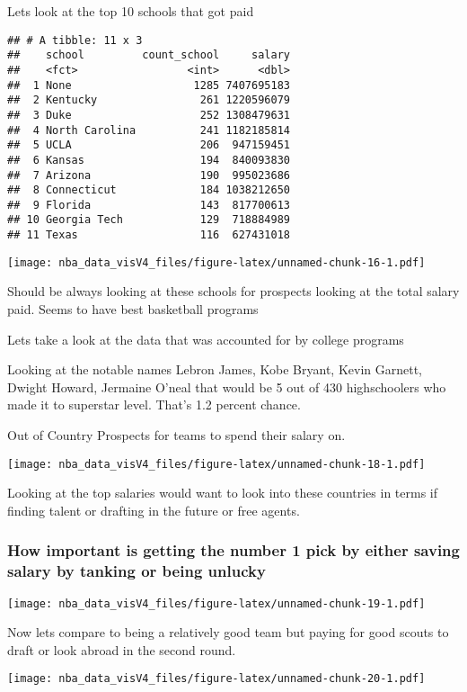 \documentclass[]{article}
\begin{document}
Lets look at the top 10 schools that got paid

\begin{verbatim}
## # A tibble: 11 x 3
##    school         count_school     salary
##    <fct>                 <int>      <dbl>
##  1 None                   1285 7407695183
##  2 Kentucky                261 1220596079
##  3 Duke                    252 1308479631
##  4 North Carolina          241 1182185814
##  5 UCLA                    206  947159451
##  6 Kansas                  194  840093830
##  7 Arizona                 190  995023686
##  8 Connecticut             184 1038212650
##  9 Florida                 143  817700613
## 10 Georgia Tech            129  718884989
## 11 Texas                   116  627431018
\end{verbatim}

\texttt{[image: nba\_data\_visV4\_files/figure-latex/unnamed-chunk-16-1.pdf]}

Should be always looking at these schools for prospects looking at the
total salary paid. Seems to have best basketball programs

Lets take a look at the data that was accounted for by college programs

Looking at the notable names Lebron James, Kobe Bryant, Kevin Garnett,
Dwight Howard, Jermaine O'neal that would be 5 out of 430 highschoolers
who made it to superstar level. That's 1.2 percent chance.

Out of Country Prospects for teams to spend their salary on.

\texttt{[image: nba\_data\_visV4\_files/figure-latex/unnamed-chunk-18-1.pdf]}

Looking at the top salaries would want to look into these countries in
terms if finding talent or drafting in the future or free agents.

\subsubsection{How important is getting the number 1 pick by either
saving salary by tanking or being
unlucky}\label{how-important-is-getting-the-number-1-pick-by-either-saving-salary-by-tanking-or-being-unlucky}

\texttt{[image: nba\_data\_visV4\_files/figure-latex/unnamed-chunk-19-1.pdf]}

Now lets compare to being a relatively good team but paying for good
scouts to draft or look abroad in the second round.

\texttt{[image: nba\_data\_visV4\_files/figure-latex/unnamed-chunk-20-1.pdf]}
\end{document}
